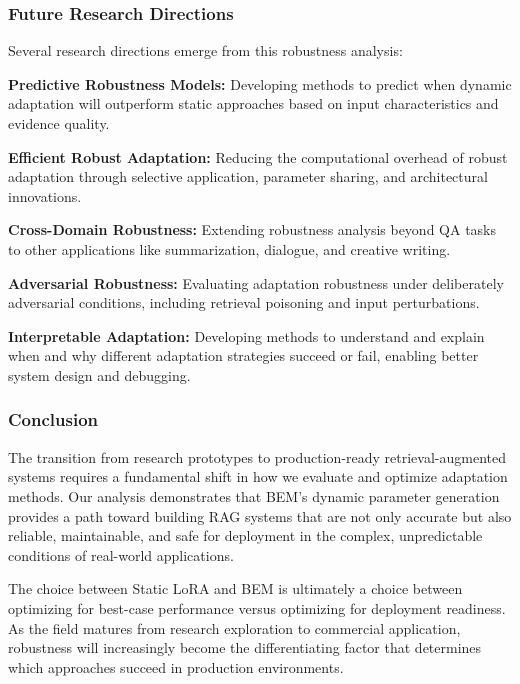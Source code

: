 \subsubsection{Future Research Directions}

Several research directions emerge from this robustness analysis:

\textbf{Predictive Robustness Models:} Developing methods to predict when dynamic adaptation will outperform static approaches based on input characteristics and evidence quality.

\textbf{Efficient Robust Adaptation:} Reducing the computational overhead of robust adaptation through selective application, parameter sharing, and architectural innovations.

\textbf{Cross-Domain Robustness:} Extending robustness analysis beyond QA tasks to other applications like summarization, dialogue, and creative writing.

\textbf{Adversarial Robustness:} Evaluating adaptation robustness under deliberately adversarial conditions, including retrieval poisoning and input perturbations.

\textbf{Interpretable Adaptation:} Developing methods to understand and explain when and why different adaptation strategies succeed or fail, enabling better system design and debugging.

\subsubsection{Conclusion}

The transition from research prototypes to production-ready retrieval-augmented systems requires a fundamental shift in how we evaluate and optimize adaptation methods. Our analysis demonstrates that BEM's dynamic parameter generation provides a path toward building RAG systems that are not only accurate but also reliable, maintainable, and safe for deployment in the complex, unpredictable conditions of real-world applications.

The choice between Static LoRA and BEM is ultimately a choice between optimizing for best-case performance versus optimizing for deployment readiness. As the field matures from research exploration to commercial application, robustness will increasingly become the differentiating factor that determines which approaches succeed in production environments.